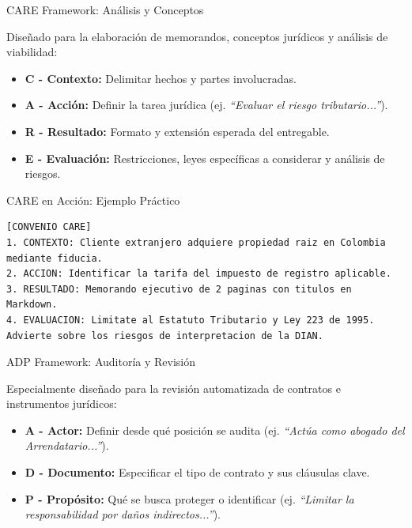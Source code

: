 \documentclass[aspectratio=169]{beamer}
\begin{document}
\begin{frame}[fragile]{CARE Framework: Análisis y Conceptos}


Diseñado para la elaboración de memorandos, conceptos jurídicos y análisis de viabilidad:

\begin{itemize}
  \item \textbf{C - Contexto:} Delimitar hechos y partes involucradas.
  \item \textbf{A - Acción:} Definir la tarea jurídica (ej. \textit{``Evaluar el riesgo tributario...''}).
  \item \textbf{R - Resultado:} Formato y extensión esperada del entregable.
  \item \textbf{E - Evaluación:} Restricciones, leyes específicas a considerar y análisis de riesgos.
\end{itemize}
\end{frame}



\begin{frame}[fragile]{CARE en Acción: Ejemplo Práctico}


\begin{lstlisting}[basicstyle=\ttfamily\scriptsize]
[CONVENIO CARE]
1. CONTEXTO: Cliente extranjero adquiere propiedad raiz en Colombia mediante fiducia.
2. ACCION: Identificar la tarifa del impuesto de registro aplicable.
3. RESULTADO: Memorando ejecutivo de 2 paginas con titulos en Markdown.
4. EVALUACION: Limitate al Estatuto Tributario y Ley 223 de 1995. Advierte sobre los riesgos de interpretacion de la DIAN.
\end{lstlisting}


\end{frame}



\begin{frame}[fragile]{ADP Framework: Auditoría y Revisión}


Especialmente diseñado para la revisión automatizada de contratos e instrumentos jurídicos:

\begin{itemize}
  \item \textbf{A - Actor:} Definir desde qué posición se audita (ej. \textit{``Actúa como abogado del Arrendatario...''}).
  \item \textbf{D - Documento:} Especificar el tipo de contrato y sus cláusulas clave.
  \item \textbf{P - Propósito:} Qué se busca proteger o identificar (ej. \textit{``Limitar la responsabilidad por daños indirectos...''}).
\end{itemize}
\end{frame}
\end{document}
